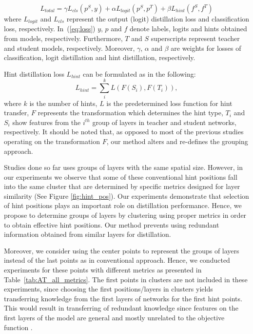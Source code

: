 \documentclass[final,3p,times]{elsarticle}
\begin{document}
{
\begin{equation}
\label{eq:loss}
    L_{total} = \gamma L_{cls}(p^S,y) + \alpha L_{logit}(p^S,p^T) + \beta L_{hint}(f^S,f^T)
\end{equation}
}where $L_{logit}$ and $L_{cls}$ represent the output (logit) distillation loss and classification loss, respectively. In~(\ref{eq:loss})
$y$, $p$ and $f$ denote labels, logits and hints obtained from models, respectively. Furthermore, $T$ and $S$ superscripts represent teacher and student models, respectively.
Moreover, $\gamma$, $\alpha$ and $\beta$ are weights for losses of classification, logit distillation and hint distillation, respectively. 

Hint distillation loss {$L_{hint}$} can be formulated as in the following:
\begin{equation}
\label{eq:l_hint}
    L_{hint} = \sum_{i}^k L(F(S_i),F(T_i)),  
\end{equation}
where $k$ is the number of hints, $L$ is the predetermined loss function for hint transfer, $F$ represents the transformation which determines the hint type, $T_i$ and $S_i$ show features from the $i^{th}$ group of layers in teacher and student networks, respectively. 
It should be noted that, as opposed to most of the previous studies operating on the transformation $F$, our method alters and re-defines the grouping approach.


Studies done so far uses groups of layers with the same spatial size. However, in our experiments we observe that some of these conventional hint positions fall into the same cluster that are determined by specific metrics designed for layer similarity (See Figure \ref{fig:hint_pos}). Our experiments demonstrate that selection of hint positions plays an important role on distillation performance. Hence, we propose to determine groups of layers by clustering using proper metrics in order to obtain effective hint positions. Our method prevents using redundant information obtained from similar layers for distillation.

Moreover, we consider using the center points to represent the groups of layers instead of the last points as in conventional approach. Hence, we conducted experiments for these points with different metrics as presented in Table~\ref{tab:AT_all_metrics}. {The first points in clusters are not included in these experiments, since choosing the first positions/layers in clusters yields transferring knowledge from the first layers of networks for the first hint points. This would result in transferring of redundant knowledge since features on the first layers of the model are general and mostly unrelated to the objective function \citep{yosinski2014transferable}.}
\end{document}

